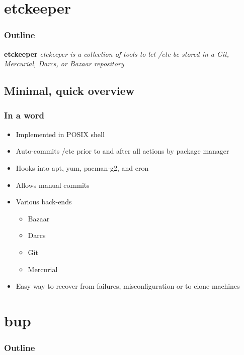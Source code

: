 \documentclass[t]{beamer}
\begin{document}
\section{etckeeper}

\begin{frame}
	\frametitle{Outline}
	\tableofcontents[currentsection]
\end{frame}

\begin{frame}
		\begin{center}
			\vfill
			\vfill
			\textbf{etckeeper}
			\vfill
			\textit{etckeeper is a collection of tools to let /etc be stored in a Git, Mercurial, Darcs, or Bazaar repository}
			\vfill
			\vfill
		\end{center}
\end{frame}

\subsection{Minimal, quick overview}

\begin{frame}
	\frametitle{In a word}
	\begin{itemize}
		\item Implemented in POSIX shell
		\item Auto-commits /etc prior to and after all actions by package manager
		\item Hooks into apt, yum, pacman-g2, and cron
		\item Allows manual commits
		\item Various back-ends
		\begin{itemize}
			\item Bazaar
			\item Darcs
			\item Git
			\item Mercurial
		\end{itemize}
		\item Easy way to recover from failures, misconfiguration or to clone machines
	\end{itemize}
\end{frame}


\section{bup}

\begin{frame}
	\frametitle{Outline}
	\tableofcontents[currentsection]
\end{frame}
\end{document}
